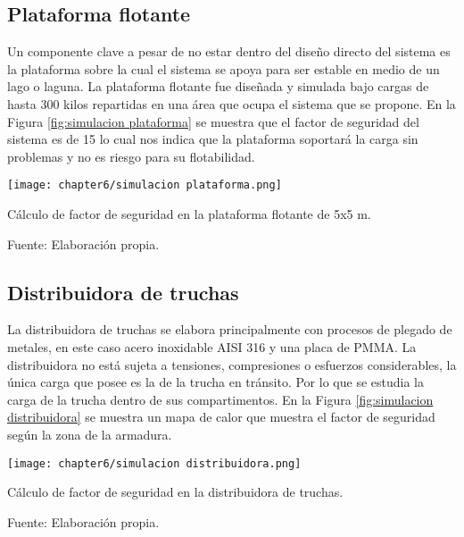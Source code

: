 \subsection{Plataforma flotante}

Un componente clave a pesar de no estar dentro del diseño directo del sistema es la plataforma sobre la cual el sistema se apoya para ser estable en medio de un lago o laguna. La plataforma flotante fue diseñada y simulada bajo cargas de hasta 300 kilos repartidas en una área que ocupa el sistema que se propone. En la Figura \ref{fig:simulacion plataforma} se muestra que el factor de seguridad del sistema es de 15 lo cual nos indica que la plataforma soportará la carga sin problemas y no es riesgo para su flotabilidad.

\begin{myfigure}[H]
	\footnotesize\centering
	\texttt{[image: chapter6/simulacion plataforma.png]}
	\caption{Cálculo de factor de seguridad en la plataforma flotante de 5x5 m.}
	\begin{myflushcenter}
		Fuente: Elaboración propia.
	\end{myflushcenter}
	\label{fig:simulacion plataforma}
\end{myfigure}


\subsection{Distribuidora de truchas}

La distribuidora de truchas se elabora principalmente con procesos de plegado de metales, en este caso acero inoxidable AISI 316 y una placa de PMMA. La distribuidora no está sujeta a tensiones, compresiones o esfuerzos considerables, la única carga que posee es la de la trucha en tránsito. Por lo que se estudia la carga de la trucha dentro de sus compartimentos. En la Figura \ref{fig:simulacion distribuidora} se muestra un mapa de calor que muestra el factor de seguridad según la zona de la armadura.

\begin{myfigure}[H]
	\footnotesize\centering
	\texttt{[image: chapter6/simulacion distribuidora.png]}
	\caption{Cálculo de factor de seguridad en la distribuidora de truchas.}
	\begin{myflushcenter}
		Fuente: Elaboración propia.
	\end{myflushcenter}
	\label{fig:simulacion distribuidora}
\end{myfigure}



